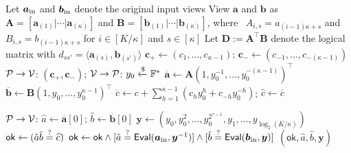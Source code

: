 \begin{algorithm}[!t]
\caption{\packedeolitebullet with contiguous stride-$\kappa$ blocks}
\label{alg:packedeolitebullet}

Let $\bm a_{\rm in}$ and $\bm b_{\rm in}$ denote the original input views\;
View $\bm a$ and $\bm b$ as
$\bm A=[\bm a_{(1)}|\cdots|\bm a_{(\kappa)}]$ and
$\bm B=[\bm b_{(1)}|\cdots|\bm b_{(\kappa)}]$, where\
\Indp
$A_{i,s}=a_{(i-1)\kappa+s}$ and
$B_{i,s}=b_{(i-1)\kappa+s}$ for
$i\in[K/\kappa]$ and $s\in[\kappa]$\;
\Indm
Let $\bm D:=\bm A^\top\bm B$ denote the logical matrix with
$d_{ss'}=\langle\bm a_{(s)},\bm b_{(s')}\rangle$\;
$\bm c_+\leftarrow(c_1,\ldots,c_{\kappa-1})$; \quad
$\bm c_-\leftarrow(c_{-1},\ldots,c_{-(\kappa-1)})$\;
${\mathcal{P} \rightarrow \mathcal{V}}$: $(\bm c_+,\bm c_-)$; \quad
${\mathcal{V} \rightarrow \mathcal{P}}$: $y_0\mathrel{\xleftarrow{\$}}{\mathbb{F}}^*$\;
$\overline{\bm a}\leftarrow
\bm A(1,y_0^{-1},\ldots,y_0^{-(\kappa-1)})^\top$\;
$\overline{\bm b}\leftarrow
\bm B(1,y_0,\ldots,y_0^{\kappa-1})^\top$\;
$\overline c\leftarrow
c+\sum_{h=1}^{\kappa-1}(c_hy_0^h+c_{-h}y_0^{-h})$; \quad
$\widehat c\leftarrow\overline c$\;

${\mathcal{P} \rightarrow \mathcal{V}}$: $\hat a\leftarrow\overline{\bm a}[0]$; \quad
$\hat b\leftarrow\overline{\bm b}[0]$\;
$\bm y\leftarrow(y_0,y_0^2,\ldots,y_0^{2^{\tau-1}},
y_1,\ldots,y_{\log_2(K/\kappa)})$\;
$\mathsf{ok}\leftarrow(\hat a\hat b\mathrel{\overset{\mathrm{?}}{=}}\widehat c)$\;
$\mathsf{ok}\leftarrow\mathsf{ok}\wedge
[\hat a\mathrel{\overset{\mathrm{?}}{=}}\mathsf{Eval}(\bm a_{\rm in}, \bm y^{-1})]\wedge
[\hat b\mathrel{\overset{\mathrm{?}}{=}}\mathsf{Eval}(\bm b_{\rm in}, \bm y)]$\;
\Return $(\mathsf{ok},\hat a,\hat b,\bm y)$\;
\end{algorithm}
